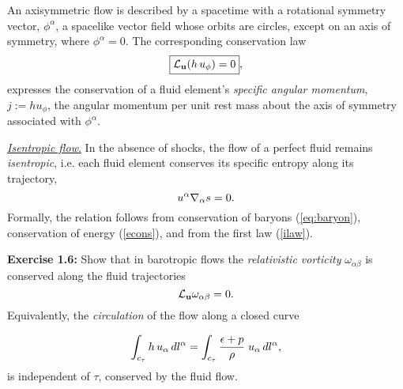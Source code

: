 \documentclass[12pt]{article}
\def\be{\begin{equation}}
\def\ee{\end{equation}}
\newcommand{\na}{\nabla}
\begin{document}
\vskip0.8cm

  An axisymmetric flow is described
by
a spacetime with a rotational symmetry vector, $\phi^\alpha$, a 
spacelike
vector field whose orbits are circles, except on an axis of symmetry, where 
$\phi^\alpha=0$.
The corresponding conservation law
\be
\boxed{ {\cal L}_{\bf u} (h\,u_\phi) = 0},
\label{amcons}
\ee
expresses the conservation of a fluid element's {\it specific angular
momentum}, $j:= hu_\phi$, the angular momentum per unit rest mass about the axis of 
symmetry associated with $\phi^\alpha$. 


\label{bernoullii}

\vskip0.8cm

\noindent\uline{{\it Isentropic flow}.}  In the absence of shocks, the flow of
a perfect fluid remains {\it isentropic}, i.e. each fluid element
conserves its specific entropy along its trajectory, 
\be
        u^\alpha\na_\alpha s=0.
\index{isentropic flow|textbf}
\label{scons}\ee
Formally, the relation follows from conservation of baryons (\ref{eq:baryon}), 
conservation of energy (\ref{econs}), and from the first law (\ref{ilaw}). 

\vskip0.8cm

\textbf{Exercise 1.6:} Show that in barotropic flows the {\it relativistic vorticity} $\omega_{\alpha\beta}$ is conserved along the fluid trajectories 
\be
{\cal L}_{\bf u} \omega_{\alpha\beta} = 0.  
\label{vortii}
\index{vorticity!conservation}\ee
Equivalently, the {\it circulation} of the flow along a closed curve

\be
\int_{c_\tau} h\,u_\alpha\, d l^\alpha=\int_{c_\tau} {{\epsilon +
p}\over
\rho}\;u_\alpha\,
d l^\alpha, \label{vortiv}
\ee
is independent of $\tau$, conserved by the fluid flow.

\vskip0.8cm



\vskip0.8cm
\end{document}
